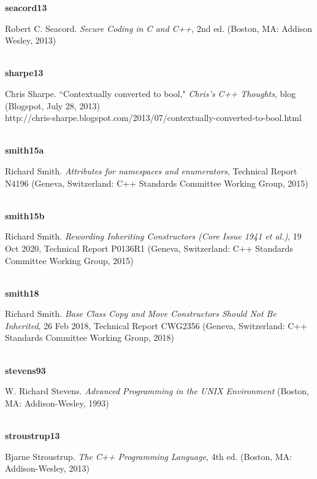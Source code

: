 \noindent\textbf{seacord13}\\
\hspace*{2em}\parbox[t]{\textwidth}{Robert C. Seacord. \textit{Secure Coding in C and C++}, 2nd ed. (Boston, MA: Addison Wesley, 2013)}\\

\noindent\textbf{sharpe13}\\
\hspace*{2em}\parbox[t]{\textwidth}{Chris Sharpe. ``Contextually converted to bool," \textit{Chris's C++ Thoughts}, blog (Blogspot, July 28, 2013)\\
http://chris-sharpe.blogspot.com/2013/07/contextually-converted-to-bool.html}\\

\noindent\textbf{smith15a}\\
\hspace*{2em}\parbox[t]{\textwidth}{Richard Smith. \textit{Attributes for namespaces and enumerators},  Technical Report N4196 (Geneva, Switzerland: C++ Standards Committee Working Group, 2015)}\\

\noindent\textbf{smith15b}\\
\hspace*{2em}\parbox[t]{\textwidth}{Richard Smith. \textit{Rewording Inheriting Constructors (Core Issue 1941 et al.)},  19 Oct 2020, Technical Report P0136R1 (Geneva, Switzerland: C++ Standards Committee Working Group, 2015)}\\

\noindent\textbf{smith18}\\
\hspace*{2em}\parbox[t]{\textwidth}{Richard Smith. \textit{Base Class Copy and Move Constructors Should Not Be Inherited}, 26 Feb 2018, Technical Report CWG2356 (Geneva, Switzerland: C++ Standards Committee Working Group, 2018)}\\


\noindent\textbf{stevens93}\\
\hspace*{2em}\parbox[t]{\textwidth}{W. Richard Stevens. \textit{Advanced Programming in the UNIX Environment} (Boston, MA: Addison-Wesley, 1993)} \\

\noindent\textbf{stroustrup13}\\
\hspace*{2em}\parbox[t]{\textwidth}{Bjarne Stroustrup. \textit{The C++ Programming Language}, 4th ed. (Boston, MA: Addison-Wesley, 2013)} \\

